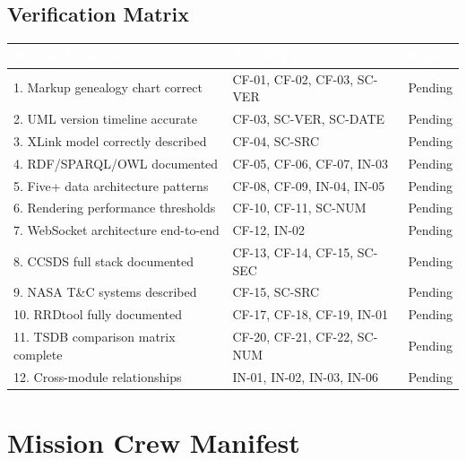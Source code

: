 \documentclass[11pt,letterpaper]{article}
\newcommand{\tableheader}[1]{\textbf{\sffamily\textcolor{white}{#1}}}
\begin{document}
\subsection{Verification Matrix}

\begin{center}
\begin{tabularx}{\textwidth}{XL{4cm}C{1.5cm}}
\toprule
{}
\tableheader{Success Criterion} & \tableheader{Test ID(s)} & \tableheader{Status} \\
. Markup genealogy chart correct & CF-01, CF-02, CF-03, SC-VER & Pending \\
2. UML version timeline accurate & CF-03, SC-VER, SC-DATE & Pending \\
3. XLink model correctly described & CF-04, SC-SRC & Pending \\
4. RDF/SPARQL/OWL documented & CF-05, CF-06, CF-07, IN-03 & Pending \\
5. Five+ data architecture patterns & CF-08, CF-09, IN-04, IN-05 & Pending \\
6. Rendering performance thresholds & CF-10, CF-11, SC-NUM & Pending \\
7. WebSocket architecture end-to-end & CF-12, IN-02 & Pending \\
8. CCSDS full stack documented & CF-13, CF-14, CF-15, SC-SEC & Pending \\
9. NASA T\&C systems described & CF-15, SC-SRC & Pending \\
10. RRDtool fully documented & CF-17, CF-18, CF-19, IN-01 & Pending \\
11. TSDB comparison matrix complete & CF-20, CF-21, CF-22, SC-NUM & Pending \\
12. Cross-module relationships & IN-01, IN-02, IN-03, IN-06 & Pending \\
\bottomrule
\end{tabularx}
\end{center}

\section{Mission Crew Manifest}
\end{document}
